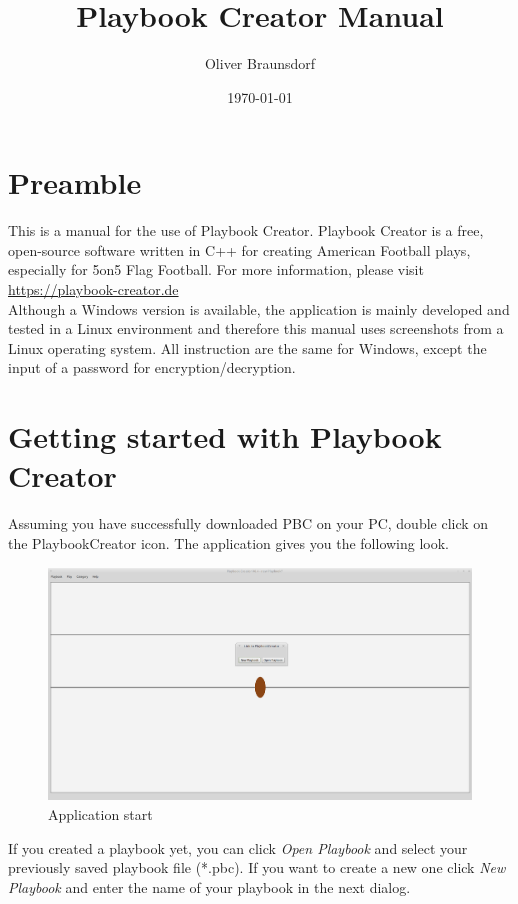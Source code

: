 \documentclass[10pt,a4paper]{article}
\title{Playbook Creator Manual}
\author{Oliver Braunsdorf}
\date{\today}
\begin{document}
	\maketitle
	\clearpage
	\tableofcontents
	\clearpage
	
	\section{Preamble}
		This is a manual for the use of Playbook Creator. Playbook Creator is a free, open-source  software written in C++ for creating American Football plays, especially for 5on5 Flag Football. For more information, please visit \\ \mbox{\url{https://playbook-creator.de}} \\
		
		Although a Windows version is available, the application is mainly developed and tested in a Linux environment and therefore this manual uses screenshots from a Linux operating system. All instruction are the same for Windows, except the input of a password for encryption/decryption.
	\clearpage
	
	\section{Getting started with Playbook Creator}
		Assuming you have successfully downloaded PBC on your PC, double click on the PlaybookCreator icon. The application gives you the following look.
		\begin{figure}[h] \centering
			\includegraphics[scale=.2]{images/appStart.png}
			\caption{Application start}
			\label{fig:appStart}
		\end{figure}		
		If you created a playbook yet, you can click \textit{Open Playbook} and select your previously saved playbook file (*.pbc). If you want to create a new one click \textit{New Playbook} and enter the name of your playbook in the next dialog. \\
		
\end{document}
